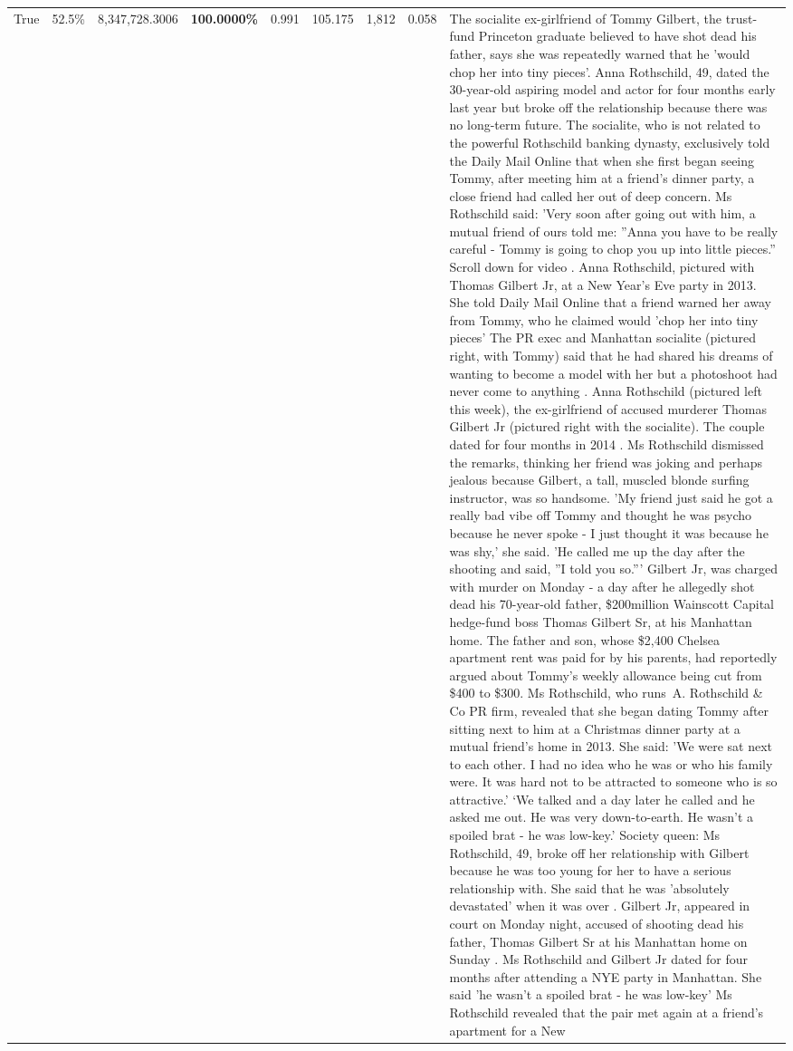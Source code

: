 \begin{table}[H]
\begin{tabular}{lllrlllll}
True & 52.5\% & 8,347,728.3006 & \bfseries \color{red} 100.0000\% & 0.991 & 105.175 & 1,812 & 0.058 & The socialite ex-girlfriend of Tommy Gilbert, the trust-fund Princeton graduate believed to have shot dead his father, says she was repeatedly warned that he 'would chop her into tiny pieces'. Anna Rothschild, 49, dated the 30-year-old aspiring model and actor for four months early last year but broke off the relationship because there was no long-term future. The socialite, who is not related to the powerful Rothschild banking dynasty, exclusively told the Daily Mail Online that when she first began seeing Tommy, after meeting him at a friend's dinner party, a close friend had called her out of deep concern. Ms Rothschild said: 'Very soon after going out with him, a mutual friend of ours told me: ''Anna you have to be really careful - Tommy is going to chop you up into little pieces.'' Scroll down for video . Anna Rothschild, pictured with Thomas Gilbert Jr, at a New Year's Eve party in 2013. She told Daily Mail Online that a friend warned her away from Tommy, who he claimed would 'chop her into tiny pieces' The PR exec and Manhattan socialite (pictured right, with Tommy) said that he had shared his dreams of wanting to become a model with her but a photoshoot had never come to anything . Anna Rothschild (pictured left this week), the ex-girlfriend of accused murderer Thomas Gilbert Jr (pictured right with the socialite). The couple dated for four months in 2014 . Ms Rothschild dismissed the remarks, thinking her friend was joking and perhaps jealous because Gilbert, a tall, muscled blonde surfing instructor, was so handsome. 'My friend just said he got a really bad vibe off Tommy and thought he was psycho because he never spoke - I just thought it was because he was shy,' she said. 'He called me up the day after the shooting and said, ''I told you so.''' Gilbert Jr, was charged with murder on Monday - a day after he allegedly shot dead his 70-year-old father, \$200million Wainscott Capital hedge-fund boss Thomas Gilbert Sr, at his Manhattan home. The father and son, whose \$2,400 Chelsea apartment rent was paid for by his parents, had reportedly argued about Tommy's weekly allowance being cut from \$400 to \$300. Ms Rothschild, who runs A. Rothschild \& Co PR firm, revealed that she began dating Tommy after sitting next to him at a Christmas dinner party at a mutual friend's home in 2013. She said: 'We were sat next to each other. I had no idea who he was or who his family were. It was hard not to be attracted to someone who is so attractive.' ‘We talked and a day later he called and he asked me out. He was very down-to-earth. He wasn’t a spoiled brat - he was low-key.’ Society queen: Ms Rothschild, 49, broke off her relationship with Gilbert because he was too young for her to have a serious relationship with. She said that he was 'absolutely devastated' when it was over . Gilbert Jr, appeared in court on Monday night, accused of shooting dead his father, Thomas Gilbert Sr at his Manhattan home on Sunday . Ms Rothschild and Gilbert Jr dated for four months after attending a NYE party in Manhattan. She said 'he wasn't a spoiled brat - he was low-key' Ms Rothschild revealed that the pair met again at a friend’s apartment for a New 
\end{tabular}
\end{table}
